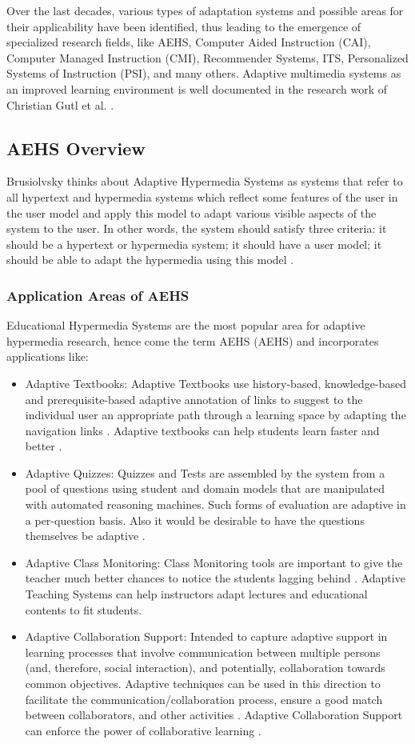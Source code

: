 \documentclass[12pt,a4paper,final,twoside,onecolumn,titlepage]{book}
\begin{document}
Over the last decades, various types of adaptation systems and possible areas for their applicability have been identified, thus leading to the emergence of specialized research fields, like \gls{AEHS}, Computer Aided Instruction (CAI), Computer Managed Instruction (CMI), Recommender Systems, \gls{ITS}, Personalized Systems of Instruction (PSI), and many others. Adaptive multimedia systems as an improved learning environment is well documented in the research work of Christian Gutl et al. \cite{R15}.

\subsection{AEHS Overview}
Brusiolvsky thinks about Adaptive Hypermedia Systems as systems that refer to all hypertext and hypermedia systems which reflect some features of the user in the user model and apply this model to adapt various visible aspects of the system to the user. In other words, the system should satisfy three criteria: it should be a hypertext or hypermedia system; it should have a user model; it should be able to adapt the hypermedia using this model \cite{R14}.
\subsubsection{Application Areas of AEHS}
Educational Hypermedia Systems are the most popular area for adaptive hypermedia research,  hence come the term \gls{AEHS} (\gls{AEHS}) and incorporates applications like:
\begin{itemize}
\item Adaptive Textbooks: Adaptive Textbooks use history-based, knowledge-based and prerequisite-based adaptive annotation of links to suggest to the individual user an appropriate path through a learning space by adapting the navigation links \cite{R16}. Adaptive textbooks can help students learn faster and better \cite{R12}.
\item Adaptive Quizzes: Quizzes and Tests are assembled by the system from a pool of questions using student and domain models that are manipulated with automated reasoning machines. Such forms of evaluation are adaptive in a per-question basis. Also it would be desirable to have the questions themselves be adaptive \cite{R17}.
\item Adaptive Class Monitoring: Class Monitoring tools are important to give the teacher much better chances to notice the students lagging behind \cite{R12}. Adaptive Teaching Systems can help instructors adapt lectures and educational contents to fit students.
\item Adaptive Collaboration Support: Intended to capture adaptive support in learning processes that involve communication between multiple persons (and, therefore, social interaction), and potentially, collaboration towards common objectives. Adaptive techniques can be used in this direction to facilitate the communication/collaboration process, ensure a good match between collaborators, and other activities \cite{R18}. Adaptive Collaboration Support can enforce the power of collaborative learning \cite{R12}.
\end{itemize}
\end{document}
